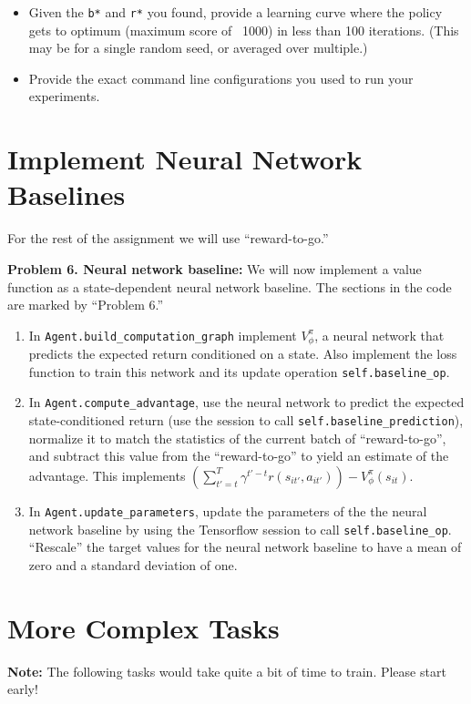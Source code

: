 \documentclass[12pt]{article}
\begin{document}
\begin{itemize}
\item Given the \texttt{b*} and \texttt{r*} you found, provide a learning curve where the policy gets to optimum (maximum score of ~1000) in less than 100 iterations. (This may be for a single random seed, or averaged over multiple.)
\item Provide the exact command line configurations you used to run your experiments.
\end{itemize}


\section{Implement Neural Network Baselines}
For the rest of the assignment we will use ``reward-to-go.''

\textbf{Problem 6. Neural network baseline:} We will now implement a value function as a state-dependent neural network baseline. The sections in the code are marked by ``Problem 6.''
\begin{enumerate} [label=(\alph*)]
    \item In \verb|Agent.build_computation_graph| implement $V_\phi^\pi$, a neural network that predicts the expected return conditioned on a state. Also implement the loss function to train this network and its update operation \texttt{self.baseline\_op}.
    \item In \verb|Agent.compute_advantage|, use the neural network to predict the expected state-conditioned return (use the session to call \texttt{self.baseline\_prediction}), normalize it to match the statistics of the current batch of ``reward-to-go'', and subtract this value from the ``reward-to-go'' to yield an estimate of the advantage. This implements $\left(\sum_{t'=t}^T \gamma^{t'-t} r(s_{it'}, a_{it'})\right) - V_\phi^\pi\left(s_{it}\right)$.
    \item In \verb|Agent.update_parameters|, update the parameters of the the neural network baseline by using the Tensorflow session to call \texttt{self.baseline\_op}. ``Rescale'' the target values for the neural network baseline to have a mean of zero and a standard deviation of one.
\end{enumerate}

\section{More Complex Tasks}
\textbf{Note:} The following tasks would take quite a bit of time to train. Please start early!
\end{document}
